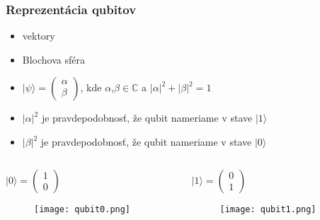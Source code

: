 \documentclass{beamer}
\newcommand{\ket}[1]{\lvert#1\rangle} %
\newcommand\abs[1]{\left|#1\right|}
\begin{document}
\begin{frame}
	\frametitle{Reprezentácia qubitov}
	\begin{itemize}
		\item vektory
		\item Blochova sféra
		\item $\ket{\psi} = \begin{pmatrix}
		      \alpha \\
		      \beta
		\end{pmatrix}$, kde  $\alpha$,$\beta \in \mathbb{C}$ a $\abs{\alpha}^2 + \abs{\beta}^2 = 1$ 
		\item $\abs{\alpha}^2$ je pravdepodobnosť, že qubit nameriame v stave $\ket{1}$
		\item $\abs{\beta}^2$ je pravdepodobnosť, že qubit nameriame v stave $\ket{0}$
	\end{itemize}
	\begin{columns}[c]
		\begin{column}{.3\textwidth}
			\centering
			$\ket{0} = \begin{pmatrix}
			1\\
			0
			\end{pmatrix}$
			\begin{figure}
				\centering
				\texttt{[image: qubit0.png]}            
			\end{figure}
		\end{column}
						
		\begin{column}{.3\textwidth}
			\centering
			$\ket{1} = \begin{pmatrix}
			0\\
			1
			\end{pmatrix}$
			\begin{figure}
				\centering
				\texttt{[image: qubit1.png]}            
			\end{figure}
		\end{column}
						
		
	\end{columns}
			    
\end{frame}
\end{document}
